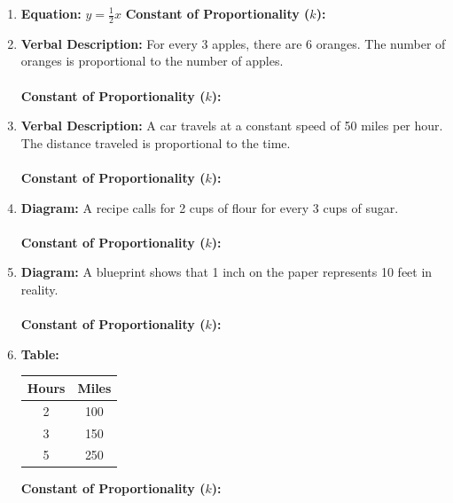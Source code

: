 \documentclass[12pt, letterpaper, fleqn]{article}
\newcommand{\blank}{\underline{\hspace{2.2cm}}}
\begin{document}
\begin{enumerate}[itemsep=4.2cm, leftmargin=0.6cm, resume]
\item \textbf{Equation:} $y = \frac{1}{2}x$\qquad
\textbf{Constant of Proportionality ($k$):} \blank
\item \textbf{Verbal Description:} For every 3 apples, there are 6 oranges. The number of oranges is proportional to the number of apples. \\ \\
\textbf{Constant of Proportionality ($k$):} \blank
\item \textbf{Verbal Description:} A car travels at a constant speed of 50 miles per hour. The distance traveled is proportional to the time. \\ \\
\textbf{Constant of Proportionality ($k$):} \blank
\item \textbf{Diagram:} A recipe calls for 2 cups of flour for every 3 cups of sugar.\\ \\
\textbf{Constant of Proportionality ($k$):} \blank
\item \textbf{Diagram:} A blueprint shows that 1 inch on the paper represents 10 feet in reality.\\ \\
\textbf{Constant of Proportionality ($k$):} \blank
\item \textbf{Table:}
\begin{center}
\begin{tabular}{|c|c|}
\hline
Hours & Miles \\
\hline
2 & 100 \\
3 & 150 \\
5 & 250 \\
\hline
\end{tabular}
\end{center}
\textbf{Constant of Proportionality ($k$):} \blank
\end{enumerate}
\end{document}
